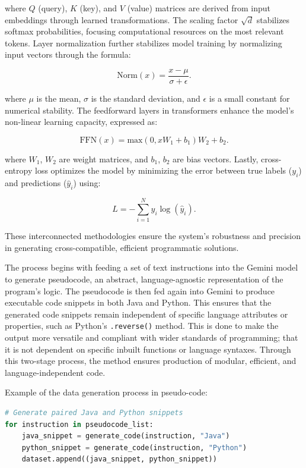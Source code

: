 \documentclass{dhbenelux}
\begin{document}
where \( Q \) (query), \( K \) (key), and \( V \) (value) matrices are derived from input embeddings through learned transformations. The scaling factor \( \sqrt{d} \) stabilizes softmax probabilities, focusing computational resources on the most relevant tokens. Layer normalization further stabilizes model training by normalizing input vectors through the formula:  

\begin{equation}
\text{Norm}(x) = \frac{x - \mu}{\sigma + \epsilon}.
\label{eq:layer-norm}
\end{equation}

where \( \mu \) is the mean, \( \sigma \) is the standard deviation, and \( \epsilon \) is a small constant for numerical stability. The feedforward layers in transformers enhance the model’s non-linear learning capacity, expressed as:  

\begin{equation}
\text{FFN}(x) = \text{max}(0, xW_1 + b_1)W_2 + b_2.
\label{eq:ffn}
\end{equation}

where \( W_1 \), \( W_2 \) are weight matrices, and \( b_1 \), \( b_2 \) are bias vectors. Lastly, cross-entropy loss optimizes the model by minimizing the error between true labels (\( y_i \)) and predictions (\( \hat{y}_i \)) using:  

\begin{equation}
L = -\sum_{i=1}^N y_i \log(\hat{y}_i).
\label{eq:cross-entropy}
\end{equation}

These interconnected methodologies ensure the system’s robustness and precision in generating cross-compatible, efficient programmatic solutions.

The process begins with feeding a set of text instructions into the Gemini model to generate pseudocode, an abstract, language-agnostic representation of the program's logic. The pseudocode is then fed again into Gemini to produce executable code snippets in both Java and Python. This ensures that the generated code snippets remain independent of specific language attributes or properties, such as Python's \texttt{.reverse()} method. This is done to make the output more versatile and compliant with wider standards of programming; that it is not dependent on specific inbuilt functions or language syntaxes. Through this two-stage process, the method ensures production of modular, efficient, and language-independent code.

\noindent Example of the data generation process in pseudo-code:
\begin{lstlisting}[language=Python, caption={Pseudocode for Dataset Preparation}]
# Generate paired Java and Python snippets
for instruction in pseudocode_list:
    java_snippet = generate_code(instruction, "Java")
    python_snippet = generate_code(instruction, "Python")
    dataset.append((java_snippet, python_snippet))
\end{lstlisting}
\end{document}
